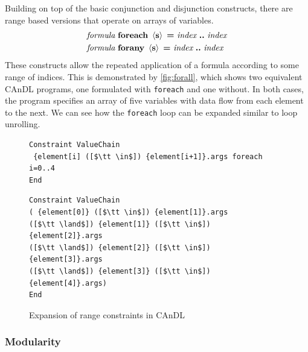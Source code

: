     Building on top of the basic conjunction and disjunction constructs, there
    are range based versions that operate on arrays of variables.
    \begin{align*}
        \text{\it formula}\ &\text{\bf foreach}\ \left<\text{\bf s}\right>\ \text{\bf =}\ \text{\it index}\ \text{\bf ..}\ \text{\it index}\\
        \text{\it formula}\ &\text{\bf forany}\ \left<\text{\bf s}\right>\ \text{\bf =}\ \text{\it index}\ \text{\bf ..}\ \text{\it index}
    \end{align*}
    These constructs allow the repeated application of a formula according to
    some range of indices.
    This is demonstrated by \autoref{fig:forall}, which shows two equivalent
    CAnDL programs, one formulated with \texttt{foreach} and one without.
    In both cases, the program specifies an array of five variables with data
    flow from each element to the next.
    We can see how the \texttt{foreach} loop can be expanded similar to loop
    unrolling.

\begin{figure}[ht]
\begin{lstlisting}[language=CAnDL]
Constraint ValueChain
 {element[i] ([$\tt \in$]) {element[i+1]}.args foreach i=0..4
End
\end{lstlisting}
\begin{lstlisting}[language=CAnDL]
Constraint ValueChain
( {element[0]} ([$\tt \in$]) {element[1]}.args
([$\tt \land$]) {element[1]} ([$\tt \in$]) {element[2]}.args
([$\tt \land$]) {element[2]} ([$\tt \in$]) {element[3]}.args
([$\tt \land$]) {element[3]} ([$\tt \in$]) {element[4]}.args)
End
\end{lstlisting}
\vspace{-0.3cm}
\caption{Expansion of range constraints in CAnDL}
\label{fig:forall}
\end{figure}

\subsubsection{Modularity}
    \label{sec:modularity}


